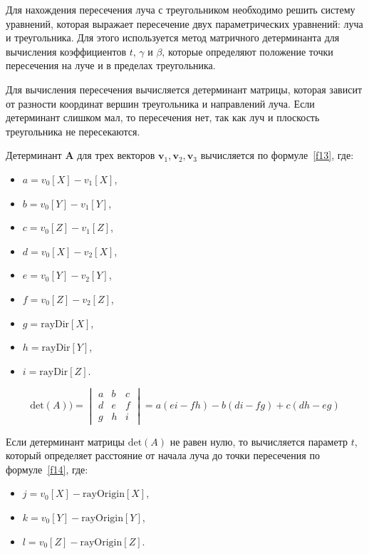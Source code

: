Для нахождения пересечения луча с треугольником необходимо решить систему уравнений, которая выражает пересечение двух параметрических уравнений: луча и треугольника. Для этого используется метод матричного детерминанта для вычисления коэффициентов \( t \), \( \gamma \) и \( \beta \), которые определяют положение точки пересечения на луче и в пределах треугольника.

Для вычисления пересечения вычисляется детерминант матрицы, которая зависит от разности координат вершин треугольника и направлений луча. Если детерминант слишком мал, то пересечения нет, так как луч и плоскость треугольника не пересекаются.

Детерминант \(\mathbf{A}\) для трех векторов \(\mathbf{v}_1, \mathbf{v}_2, \mathbf{v}_3\) вычисляется по формуле~\ref{f13}, где:
\begin{itemize}
    \item \(a = v_0[X] - v_1[X]\),
    \item \(b = v_0[Y] - v_1[Y]\),
    \item \(c = v_0[Z] - v_1[Z]\),
    \item \(d = v_0[X] - v_2[X]\),
    \item \(e = v_0[Y] - v_2[Y]\),
    \item \(f = v_0[Z] - v_2[Z]\),
    \item \(g = \text{rayDir}[X]\),
    \item \(h = \text{rayDir}[Y]\),
    \item \(i = \text{rayDir}[Z]\).
\end{itemize}

\begin{equation}
\text{det}(A)) = 
\begin{vmatrix}
a & b & c \\
d & e & f \\
g & h & i
\end{vmatrix} = a(ei - fh) - b(di - fg) + c(dh - eg)
\label{f13}
\end{equation}

Если детерминант матрицы \(\text{det}(A)\) не равен нулю, то вычисляется параметр \(t\), который определяет расстояние от начала луча до точки пересечения по формуле~\ref{f14}, где:
\begin{itemize}
    \item \(j = v_0[X] - \text{rayOrigin}[X]\),
    \item \(k = v_0[Y] - \text{rayOrigin}[Y]\),
    \item \(l = v_0[Z] - \text{rayOrigin}[Z]\).
\end{itemize}

